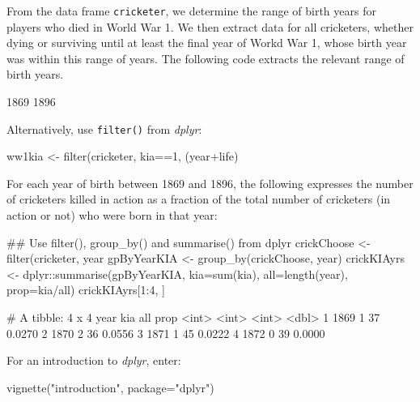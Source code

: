 \documentclass{tufte-book}\usepackage[]{graphicx}\usepackage[]{color}
\newcommand{\txtt}[1]{\texttt{#1}}
\begin{document}
From the data frame \txtt{cricketer}, we determine the range of birth
years for players who died in World War 1.  We then extract data for
all cricketers, whether dying or surviving until at least the final
year of Workd War 1, whose birth year was within this range of years.
The following code extracts the relevant range of birth years.
\begin{Schunk}
\begin{Soutput}
[1] 1869 1896
\end{Soutput}
\end{Schunk}

Alternatively, use \txtt{filter()} from {\em dplyr}:
\begin{Schunk}
\begin{Sinput}
ww1kia <- filter(cricketer,
                 kia==1, (year+life)%
\end{Sinput}
\end{Schunk}

For each year of birth between 1869 and 1896, the following expresses
the number of cricketers killed in action as a fraction of the total
number of cricketers (in action or not) who were born in that year:
\begin{fullwidth}
\begin{Schunk}
\begin{Sinput}
## Use filter(), group_by() and summarise() from dplyr
crickChoose <- filter(cricketer,
                      year%
gpByYearKIA <- group_by(crickChoose, year)
crickKIAyrs <- dplyr::summarise(gpByYearKIA,
                                kia=sum(kia), all=length(year), prop=kia/all)
crickKIAyrs[1:4, ]
\end{Sinput}
\begin{Soutput}
# A tibble: 4 x 4
   year   kia   all   prop
  <int> <int> <int>  <dbl>
1  1869     1    37 0.0270
2  1870     2    36 0.0556
3  1871     1    45 0.0222
4  1872     0    39 0.0000
\end{Soutput}
\end{Schunk}
\end{fullwidth}

For an introduction to {\em dplyr}, enter:
\begin{Schunk}
\begin{Sinput}
vignette("introduction", package="dplyr")
\end{Sinput}
\end{Schunk}
\end{document}
